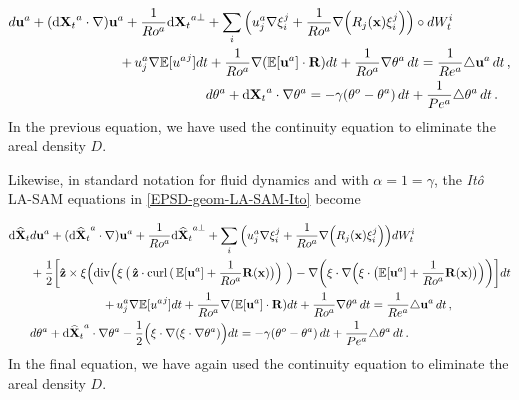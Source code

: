 \documentclass[11pt, oneside]{article}   	%
\numberwithin{equation}{section}
\theoremstyle{plain}
\theoremstyle{definition}
\theoremstyle{remark}
\newcommand{\<}{\langle}
\renewcommand{\>}{\rangle}
\def\rmd{{\mathrm{d}}}
\newcommand{\wh}[1]{\widehat{#1}}
\begin{document}
\begin{align}
d\mathbf{u}^{a}+({\rmd\mathbf{X}_{t}}^{a}\cdot \nabla )\mathbf{u}
^{a}+\frac{1}{Ro^{a}}{\rmd\mathbf{X}_{t}}^{a\bot }
& +{
\sum_{i}\Big(u_{j}^{a}\nabla \xi _{i}^{j}+\frac{1}{Ro^{a}}\nabla \Big(R_{j}
\mathbf{(x})\xi _{i}^{j}\Big)\Big)\circ dW_{t}^{i}} 
 \notag\\
& \hspace{-22mm}{+\,u_{j}^{a}\nabla \mathbb{E}[{u^{a}}^{j}]dt+
\frac{1}{Ro^{a}}\nabla (\mathbb{E}[{\mathbf{u}}^{a}]\cdot \mathbf{R})dt}+
\frac{1}{Ro^{a}}\nabla \theta ^{a}\,dt=\frac{1}{Re^{a}}\triangle \mathbf{u}^{a}\,dt\,,
 \notag\\
& d\theta ^{a}+{\rmd\mathbf{X}_{t}}^{a}\cdot \nabla \theta
^{a}=-\gamma (\theta ^{o}-\theta ^{a})\,dt + \frac{1}{Pe^{a}}\triangle \theta ^{a}\,dt\,.
\label{COUPLED_SWE_T_A_STOCH_LA-Strat}
\end{align}
In the previous equation, we have used the continuity equation to eliminate the areal density $D$.

Likewise, in standard notation for fluid dynamics and with $\alpha=1=\gamma$, the \emph{It\^o} LA-SAM equations in \eqref{EPSD-geom-LA-SAM-Ito} become

\begin{align}{\rmd\mathbf{\wh{X}}_{t}}
& d\mathbf{u}^{a}+({\rmd\mathbf{\wh{X}}_{t}}^{a}\cdot \nabla )\mathbf{u}
^{a}+\frac{1}{Ro^{a}}{\rmd\mathbf{\wh{X}}_{t}}^{a\bot }
 + {
\sum_{i}\Big(u_{j}^{a}\nabla \xi _{i}^{j}+\frac{1}{Ro^{a}}\nabla \Big(R_{j}
\mathbf{(x})\xi _{i}^{j}\Big)\Big) dW_{t}^{i}}  \nonumber \\
&+\frac12 \bigg[ \mathbf{\hat{z}}\times \xi \Big( {\rm div}\Big(\xi\,\big(\,\mathbf{\hat{z}}\cdot{\rm curl}\,(\,\mathbb{E}[{\mathbf{u}}^{a}] + \frac{1}{Ro^{a}}\mathbf{R}(\mathbf{x}) \big)\Big) \,\,\Big)  
- \nabla \bigg( \xi\cdot\nabla\Big(\xi \cdot\big(\mathbb{E}[{\mathbf{u}}^{a}] + \frac{1}{Ro^{a}}\mathbf{R}(\mathbf{x})\big) \Big)
\bigg)\bigg]dt
\nonumber \\& \hspace{22mm}{+\,u_{j}^{a}\nabla \mathbb{E}[{u^{a}}^{j}]dt+
\frac{1}{Ro^{a}}\nabla (\mathbb{E}[{\mathbf{u}}^{a}]\cdot \mathbf{R})dt}+
\frac{1}{Ro^{a}}\nabla \theta ^{a}\,dt = \frac{1}{Re^{a}}\triangle \mathbf{u}^{a}\,dt\,,
\label{COUPLED_SWE_VELOC_A_STOCH_LA-Ito} \\
& d\theta ^{a}+{\rmd\mathbf{\wh{X}}_{t}}^{a}\cdot \nabla \theta
^{a} - \frac12 \Big(\xi\cdot\nabla(\xi\cdot\nabla \theta^a)  \Big)dt 
=-\gamma (\theta ^{o}-\theta ^{a})\,dt +  \frac{1}{Pe^{a}}\triangle \theta ^{a}\,dt
\,.
\label{COUPLED_SWE_T_A_STOCH_LA-Ito}
\end{align}
In the final equation, we have again used the continuity equation to eliminate the areal density $D$.
\end{document}
